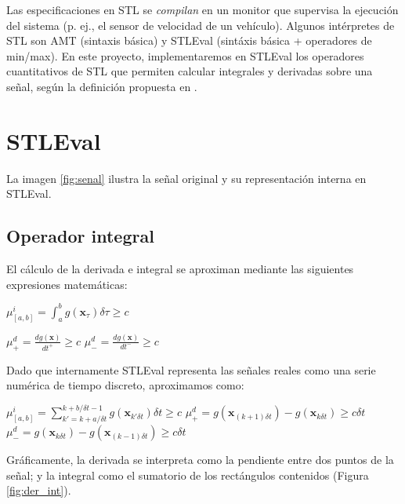 Las especificaciones en STL se \textit{compilan} en un monitor que supervisa la ejecución del sistema (p. ej., el sensor de velocidad de un vehículo). Algunos intérpretes de STL son AMT \cite{AMT2} (sintaxis básica) y STLEval \cite{StlEval} (sintáxis básica + operadores de min/max). En este proyecto, implementaremos en STLEval los operadores cuantitativos de STL que permiten calcular integrales y derivadas sobre una señal, según la definición propuesta en \cite{Stl_Der_Int}.

\section{STLEval}

La imagen \ref{fig:senal} ilustra la señal original y su representación interna en STLEval. 


\subsection{Operador integral}

El cálculo de la derivada e integral se aproximan mediante las siguientes expresiones matemáticas:

$\mu^i_{[a,b]} = \int^{b}_{a} g(\mathbf{x}_{\tau}) \delta \tau \geq c$

$\mu^d_{+} = \frac{dg(\mathbf{x})}{dt^+} \geq c $
$\mu^d_{-} = \frac{dg(\mathbf{x})}{dt^-} \geq c  $

Dado que internamente STLEval representa las señales reales como una serie numérica de tiempo discreto, aproximamos como:

$\mu^i_{[a,b]} = \sum^{k + b / \delta t - 1}_{k' = k + a / \delta t} g(\mathbf{x}_{k' \delta t}) \delta t \geq c$
$\mu^d_{+} = g(\mathbf{x}_{(k + 1) \delta t}) - g(\mathbf{x}_{k \delta t}) \geq c \delta t $
$\mu^d_{-} = g(\mathbf{x}_{k \delta t}) - g(\mathbf{x}_{(k - 1) \delta t}) \geq c \delta t $


Gráficamente, la derivada se interpreta como la pendiente entre dos puntos de la señal; y la integral como el sumatorio de los rectángulos contenidos (Figura \ref{fig:der_int}).

